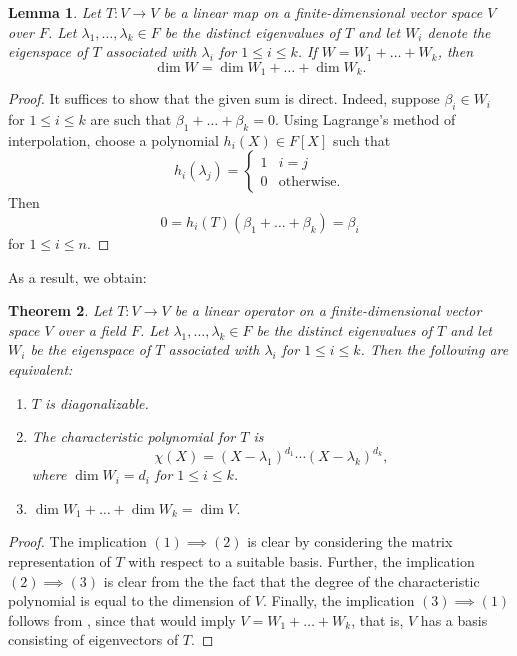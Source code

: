 \documentclass[11pt]{article}
\theoremstyle{thmstyle}
\newtheorem{theorem}{Theorem}[section]
\newtheorem{lemma}[theorem]{Lemma}
\theoremstyle{defstyle}
\renewcommand{\le}{\leqslant}
\begin{document}
\begin{lemma}
    Let $T\colon V\to V$ be a linear map on a finite-dimensional vector space $V$ over $F$. Let $\lambda_1,\dots,\lambda_k\in F$ be the distinct eigenvalues of $T$ and let $W_i$ denote the eigenspace of $T$ associated with $\lambda_i$ for $1\le i\le k$. If $W = W_1 + \dots + W_k$, then 
    \begin{equation*}
        \dim W = \dim W_1 + \dots + \dim W_k.
    \end{equation*}
\end{lemma}
\begin{proof}
    It suffices to show that the given sum is direct. Indeed, suppose $\beta_i\in W_i$ for $1\le i\le k$ are such that $\beta_1 + \dots + \beta_k = 0$. Using Lagrange's method of interpolation, choose a polynomial $h_i(X)\in F[X]$ such that 
    \begin{equation*}
        h_i(\lambda_j) = 
        \begin{cases}
            1 & i = j\\
            0 & \text{otherwise}.
        \end{cases}
    \end{equation*}
    Then 
    \begin{equation*}
        0 = h_i(T)\left(\beta_1 + \dots + \beta_k\right) = \beta_i
    \end{equation*}
    for $1\le i\le n$.
\end{proof}

As a result, we obtain: 

\begin{theorem}
    Let $T\colon V\to V$ be a linear operator on a finite-dimensional vector space $V$ over a field $F$. Let $\lambda_1,\dots,\lambda_k\in F$ be the distinct eigenvalues of $T$ and let $W_i$ be the eigenspace of $T$ associated with $\lambda_i$ for $1\le i\le k$. Then the following are equivalent: 
    \begin{enumerate}[label=(\arabic*)]
        \item $T$ is diagonalizable.
        \item The characteristic polynomial for $T$ is 
        \begin{equation*}
            \chi(X) = (X - \lambda_1)^{d_1}\cdots(X - \lambda_k)^{d_k},
        \end{equation*}
        where $\dim W_i = d_i$ for $1\le i\le k$. 
        \item $\dim W_1 + \dots + \dim W_k = \dim V$.
    \end{enumerate}
\end{theorem}
\begin{proof}
    The implication $(1)\implies(2)$ is clear by considering the matrix representation of $T$ with respect to a suitable basis. Further, the implication $(2)\implies(3)$ is clear from the the fact that the degree of the characteristic polynomial is equal to the dimension of $V$. Finally, the implication $(3)\implies(1)$ follows from , since that would imply $V = W_1 + \dots + W_k$, that is, $V$ has a basis consisting of eigenvectors of $T$.
\end{proof}
\end{document}
